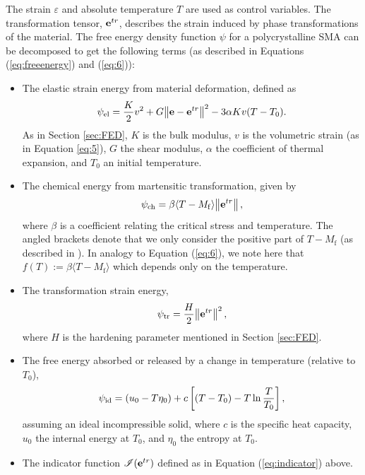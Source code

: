 \begin{multicols}{2}
The strain $\varepsilon$ and absolute temperature $T$ are used as control variables. The transformation tensor, $\vb{e}^{tr}$, describes the strain induced by phase transformations of the material. The free energy density function $\psi$ for a polycrystalline SMA can be decomposed to get the following terms (as described in Equations (\ref{eq:freeenergy}) and (\ref{eq:6})):
\begin{itemize}
    \item The elastic strain energy from material deformation, defined as
    \begin{align}
    \psi_\mathrm{el}=\frac{K}{2}v^2+G\norm{\vb{e}-\vb{e}^{tr}}^2-3\alpha Kv(T-T_0).
    \end{align}
    As in Section \ref{sec:FED}, $K$ is the bulk modulus, $v$ is the volumetric strain (as in Equation \ref{eq:5}), $G$ the shear modulus, $\alpha$ the coefficient of thermal expansion, and $T_0$ an initial temperature.
    \item The chemical energy from martensitic transformation, given by
    \begin{align}
    \psi_\mathrm{ch}=\beta \langle T-M_\mathrm{f}\rangle\norm{\vb{e}^{tr}},
    \end{align}
    where $\beta$ is a coefficient relating the critical stress and temperature. The angled brackets denote that we only consider the positive part of $T-M_\mathrm{f}$ (as described in \cite{auricchio2004three}). In analogy to Equation (\ref{eq:6}), we note here that%
    $f(T):=\beta\langle T-M_\mathrm{f}\rangle$ which depends only on the temperature.
    \item The transformation strain energy,
    \begin{align}
    \psi_\mathrm{tr}=\frac{H}{2}\norm{\vb{e}^{tr}}^2,
    \end{align}
    where $H$ is the hardening parameter mentioned in Section \ref{sec:FED}.
    \item The free energy absorbed or released by a change in temperature (relative to $T_0$),  
    \begin{align}
    \psi_\mathrm{id}=(u_0-T\eta_0)+c\sbr{(T-T_0)-T\ln\frac{T}{T_0}},
    \end{align}
    assuming an ideal incompressible solid, where $c$ is the specific heat capacity, $u_0$ the internal energy at $T_0$, and $\eta_0$ the entropy at $T_0$.
    \item The indicator function $\mathscr{I}(\vb{e}^{tr})$ defined as in Equation (\ref{eq:indicator}) above.

\end{itemize}
\end{multicols}
